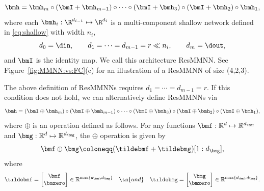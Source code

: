 \documentclass[review,hidelinks,onefignum,onetabnum]{siamart250211}
\begin{document}
\begin{equation*}
    \bmh = \bmh_m \circ (\bmI + \bmh_{m-1}) \circ \cdots \circ (\bmI + \bmh_3) \circ (\bmI + \bmh_2) \circ \bmh_1,
\end{equation*}
where each $\bmh_i: \R^{d_{i-1}} \mapsto \R^{d_i}$ is a multi-component shallow network defined in \eqref{eq:shallow} with width $n_i$, 
\begin{equation*}
    d_0=\din,\qquad d_1=\cdots=d_{m-1}=r\ll   n_i,\qquad d_m=\dout,
\end{equation*}
and $\bmI$ is the identity map. We call this architecture ResMMNN.
See 
Figure~\ref{fig:MMNN:vs:FC}(c)
for an illustration of a ResMMNN of size (4,2,3).




The above definition of ResMMNNs requires \(d_1 = \cdots = d_{m-1} = r\). If this condition does not hold, we can alternatively define ResMMNNs via
\begin{equation*}
    \bmh = (\bmI \oplus \bmh_m) \circ (\bmI \oplus \bmh_{m-1}) \circ \cdots \circ (\bmI \oplus \bmh_3) \circ (\bmI \oplus \bmh_2) \circ (\bmI \oplus \bmh_1),
\end{equation*}
where \(\oplus\) is an operation defined as follows. For any functions \( \bmf:\mathbb{R}^d \mapsto \mathbb{R}^{d_\bmf} \) and \( \bmg:\mathbb{R}^d \mapsto \mathbb{R}^{d_\bmg} \), the \(\oplus\) operation is given by
\[
\bmf \oplus \bmg \coloneqq (\tildebmf + \tildebmg)[1:d_\bmg],
\]
where
\[
\tildebmf = \begin{bmatrix}
   \bmf \\  
   \bmzero 
\end{bmatrix}
\in \mathbb{R}^{\max\{d_\bmf,d_\bmg\}}
\quad \tn{and}\quad \tildebmg = \begin{bmatrix}
   \bmg \\  
   \bmzero 
\end{bmatrix}
\in \mathbb{R}^{\max\{d_\bmf,d_\bmg\}}.
\]
\end{document}
